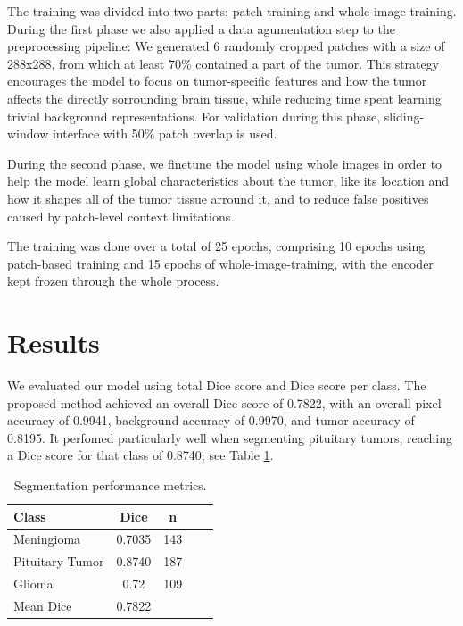 \documentclass[conference]{IEEEtran}
\begin{document}
The training was divided into two parts: patch training and whole-image training. During the first phase we also applied a data agumentation step to the preprocessing pipeline: We generated 6 randomly cropped patches with a size of 288x288, from which at least 70\% contained a part of the tumor. This strategy encourages the model to focus on tumor-specific features and how the tumor affects the directly sorrounding brain tissue, while reducing time spent learning trivial background representations. For validation during this phase, sliding-window interface with 50\% patch overlap is used.

During the second phase, we finetune the model using whole images in order to help the model learn global characteristics about the tumor, like its location and how it shapes all of the tumor tissue arround it, and to reduce false positives caused by patch-level context limitations. 

The training was done over a total of 25 epochs, comprising 10 epochs using patch-based training and 15 epochs of whole-image-training, with the encoder kept frozen through the whole process.

\section{Results}

We evaluated our model using total Dice score and Dice score per class. The proposed method achieved an overall Dice score of 0.7822, with an overall pixel accuracy of 0.9941, background accuracy of 0.9970, and tumor accuracy of 0.8195. It perfomed particularly well when segmenting pituitary tumors, reaching a Dice score for that class of 0.8740; see Table \ref{tab:segres}. 

\begin{table}[ht]
    \caption{Segmentation performance metrics.}
    \label{tab:segres}
    \centering
    \small
    \begin{tabular}{lcccc}
        \hline
        Class & Dice & n \\
        \hline
        Meningioma & 0.7035 & 143 \\
        Pituitary Tumor & 0.8740 & 187 \\ 
        Glioma & 0.72 & 109 \\
        \b{Mean Dice} & 0.7822 \\
        \hline
    \end{tabular}
\end{table}
\end{document}
